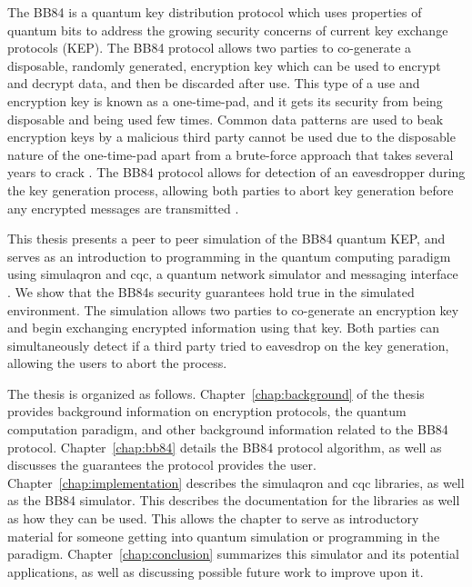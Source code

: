The BB84 is a quantum key distribution protocol which uses properties of quantum bits to address the growing security concerns of current key exchange protocols (KEP).
The BB84 protocol allows two parties to co-generate a disposable, randomly generated, encryption key which can be used to encrypt and decrypt data, and then be discarded after use.
This type of a use and encryption key is known as a one-time-pad, and it gets its security from being disposable and being used few times.
Common data patterns are used to beak encryption keys by a malicious third party cannot be used due to the disposable nature of the one-time-pad apart from a brute-force approach that takes several years to crack \cite{TODO}.
The BB84 protocol allows for detection of an eavesdropper during the key generation process, allowing both parties to abort key generation before any encrypted messages are transmitted \cite{qcftgu}.

This thesis presents a peer to peer simulation of the BB84 quantum KEP, and serves as an introduction to programming in the quantum computing paradigm using simulaqron and cqc, a quantum network simulator and messaging interface \cite{simulaqron}.
We show that the BB84s security guarantees hold true in the simulated environment.
The simulation allows two parties to co-generate an encryption key and begin exchanging encrypted information using that key.
Both parties can simultaneously detect if a third party tried to eavesdrop on the key generation, allowing the users to abort the process. 

The thesis is organized as follows.
Chapter~\ref{chap:background} of the thesis provides background information on encryption protocols, the quantum computation paradigm, and other background information related to the BB84 protocol. 
Chapter~\ref{chap:bb84} details the BB84 protocol algorithm, as well as discusses the guarantees the protocol provides the user.
Chapter~\ref{chap:implementation} describes the simulaqron and cqc libraries, as well as the BB84 simulator.
This describes the documentation for the libraries as well as how they can be used. This allows the chapter to serve as introductory material for someone getting into quantum simulation or programming in the paradigm.
Chapter~\ref{chap:conclusion} summarizes this simulator and its potential applications, as well as discussing possible future work to improve upon it.


